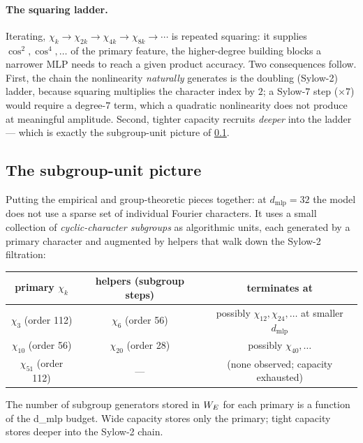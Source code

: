 \paragraph{The squaring ladder.}
Iterating, $\chi_k \to \chi_{2k} \to \chi_{4k} \to \chi_{8k} \to \cdots$ is
repeated squaring: it supplies $\cos^2, \cos^4, \ldots$ of the primary
feature, the higher-degree building blocks a narrower MLP needs to reach a
given product accuracy. Two consequences follow. First, the chain the
nonlinearity \emph{naturally} generates is the doubling (Sylow-2) ladder,
because squaring multiplies the character index by $2$; a Sylow-$7$ step
($\times 7$) would require a degree-$7$ term, which a quadratic
nonlinearity does not produce at meaningful amplitude. Second, tighter
capacity recruits \emph{deeper} into the ladder --- which is exactly the
subgroup-unit picture of \cref{subsec:harmonic-subgroup-unit}.

\subsection{The subgroup-unit picture}
\label{subsec:harmonic-subgroup-unit}

Putting the empirical and group-theoretic pieces together: at
$d_{\text{mlp}} = 32$ the model does not use a sparse set of individual
Fourier characters. It uses a small collection of \emph{cyclic-character
subgroups} as algorithmic units, each generated by a primary character
and augmented by helpers that walk down the Sylow-2 filtration:
\begin{center}
\begin{tabular}{c|c|c}
  primary $\chi_k$ & helpers (subgroup steps) & terminates at \\
  \hline
  $\chi_3$  (order 112) & $\chi_6$ (order 56)  & {\small possibly $\chi_{12}, \chi_{24}, \ldots$ at smaller $d_{\text{mlp}}$} \\
  $\chi_{10}$ (order 56) & $\chi_{20}$ (order 28) & {\small possibly $\chi_{40}, \ldots$} \\
  $\chi_{51}$ (order 112) & --- & {\small (none observed; capacity exhausted)} \\
\end{tabular}
\end{center}

The number of subgroup generators stored in $W_E$ for each primary is a
function of the d\_mlp budget. Wide capacity stores only the primary;
tight capacity stores deeper into the Sylow-2 chain.

